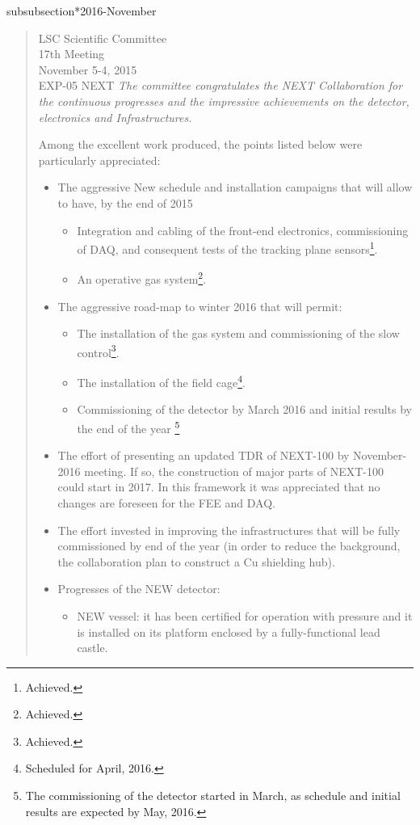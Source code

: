 subsubsection*{2016-November}
\begin{quotation}
LSC Scientific Committee\\
17th Meeting\\
November 5-4, 2015\\
EXP-05 NEXT
{\em 
The committee congratulates the NEXT Collaboration for the continuous progresses and the impressive achievements on the detector, electronics and Infrastructures.}

Among the excellent work produced, the points listed below were particularly appreciated:
\begin{itemize}
\item The aggressive New schedule and installation campaigns that will allow  to have, by the end of 2015
\begin{itemize}
\item Integration and cabling of the front-end electronics, commissioning of DAQ, and consequent tests of the tracking plane sensors\footnote{Achieved.}.
\item An operative gas system\footnote{Achieved.}.
\end{itemize}
\item The aggressive road-map to winter 2016 that will permit:
\begin{itemize}
\item The installation of the gas system and commissioning of the slow control\footnote{Achieved.}.
\item The installation of the field cage\footnote{Scheduled for April, 2016.}.
\item Commissioning of the detector by March 2016 and initial results by the end of the year \footnote{The commissioning of the detector started in March, as schedule and initial results are expected by May, 2016.}
\end{itemize}
\item The effort of presenting an updated TDR of NEXT-100 by November-2016 meeting. If so, the construction of major parts of NEXT-100 could start in 2017.  In this framework it was appreciated that no changes are foreseen for the FEE and DAQ.
\item The effort invested in improving the infrastructures that will be fully commissioned by end of the year (in order to reduce the background, the collaboration plan to construct a Cu shielding hub).
\item Progresses of the NEW detector: 
\begin{itemize}
\item NEW vessel: it has been certified for operation with pressure and it is installed on its platform enclosed by a fully-functional lead castle.

\end{itemize}
\end{itemize}
\end{quotation}
